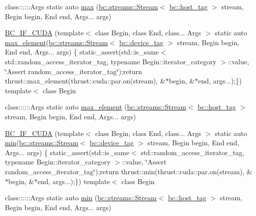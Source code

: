 \begin{DoxyCompactItemize}
\item 
class\+::::::\+Args static auto \hyperlink{namespacebc_1_1algorithms_a8dc3d1069caa869dfff3d0b9c7b52325}{max} (\hyperlink{classbc_1_1streams_1_1Stream}{bc\+::streams\+::\+Stream}$<$ \hyperlink{structbc_1_1host__tag}{bc\+::host\+\_\+tag} $>$ stream, Begin begin, End end, Args... args)
\item 
\hyperlink{namespacebc_1_1algorithms_aac8a9a31f5b60dd618dd3c6ba37b1d5f}{B\+C\+\_\+\+I\+F\+\_\+\+C\+U\+DA} (template$<$ class Begin, class End, class... Args $>$ static auto \hyperlink{namespacebc_1_1algorithms_a5948d3b24a0cb64879ed07cbb56d5443}{max\+\_\+element}(\hyperlink{classbc_1_1streams_1_1Stream}{bc\+::streams\+::\+Stream}$<$ \hyperlink{structbc_1_1device__tag}{bc\+::device\+\_\+tag} $>$ stream, Begin begin, End end, Args... args) \{ static\+\_\+assert(std\+::is\+\_\+same$<$ std\+::random\+\_\+access\+\_\+iterator\+\_\+tag, typename Begin\+::iterator\+\_\+category $>$\+::value, \char`\"{}Assert random\+\_\+access\+\_\+iterator\+\_\+tag\char`\"{});return thrust\+::max\+\_\+element(thrust\+::cuda\+::par.\+on(stream), \&$\ast$begin, \&$\ast$end, args...);\}) template$<$ class Begin
\item 
class\+::::::\+Args static auto \hyperlink{namespacebc_1_1algorithms_a5948d3b24a0cb64879ed07cbb56d5443}{max\+\_\+element} (\hyperlink{classbc_1_1streams_1_1Stream}{bc\+::streams\+::\+Stream}$<$ \hyperlink{structbc_1_1host__tag}{bc\+::host\+\_\+tag} $>$ stream, Begin begin, End end, Args... args)
\item 
\hyperlink{namespacebc_1_1algorithms_aafcccde499f184a209e8dafe7441be9f}{B\+C\+\_\+\+I\+F\+\_\+\+C\+U\+DA} (template$<$ class Begin, class End, class... Args $>$ static auto \hyperlink{namespacebc_1_1algorithms_a46bd0046dd7009497caf765c7a035cc3}{min}(\hyperlink{classbc_1_1streams_1_1Stream}{bc\+::streams\+::\+Stream}$<$ \hyperlink{structbc_1_1device__tag}{bc\+::device\+\_\+tag} $>$ stream, Begin begin, End end, Args... args) \{ static\+\_\+assert(std\+::is\+\_\+same$<$ std\+::random\+\_\+access\+\_\+iterator\+\_\+tag, typename Begin\+::iterator\+\_\+category $>$\+::value, \char`\"{}Assert random\+\_\+access\+\_\+iterator\+\_\+tag\char`\"{});return thrust\+::min(thrust\+::cuda\+::par.\+on(stream), \&$\ast$begin, \&$\ast$end, args...);\}) template$<$ class Begin
\item 
class\+::::::\+Args static auto \hyperlink{namespacebc_1_1algorithms_a46bd0046dd7009497caf765c7a035cc3}{min} (\hyperlink{classbc_1_1streams_1_1Stream}{bc\+::streams\+::\+Stream}$<$ \hyperlink{structbc_1_1host__tag}{bc\+::host\+\_\+tag} $>$ stream, Begin begin, End end, Args... args)

\end{DoxyCompactItemize}
